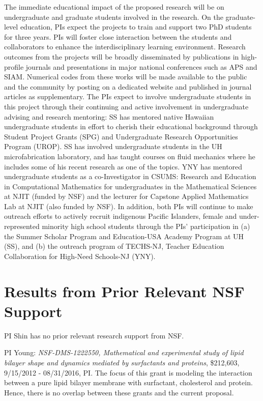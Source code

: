 \documentclass[11pt]{article}
\begin{document}
The immediate educational impact of the proposed research will be on undergraduate and graduate students involved in the research. On the graduate-level education, PIs expect the projects to train and support two PhD students for three years. PIs will foster close interaction between the students and collaborators to enhance the interdisciplinary learning environment. Research outcomes from the projects will be broadly disseminated by publications in high-profile journals and presentations in major national conferences such as APS and SIAM. Numerical codes from these works will be made available to the public and the community by posting on a dedicated website and published in journal articles as supplementary.
The PIs expect to involve undergraduate students in this project through their continuing and active involvement in undergraduate advising and research mentoring: SS has mentored native Hawaiian undergraduate students in effort to cherish their educational background through Student Project Grants (SPG) and Undergraduate Research Opportunities Program (UROP). SS has involved undergraduate students in the UH microfabrication laboratory, and has taught courses on fluid mechanics where he includes some of his recent research as one of the topics. YNY has mentored undergraduate students as a co-Investigator in CSUMS: Research and Education in Computational Mathematics for undergraduates in the Mathematical Sciences at NJIT (funded by NSF) and the lecturer for Capstone Applied Mathematics Lab at NJIT (also funded by NSF). 
In addition, both PIs will continue to make outreach efforts to actively recruit indigenous Pacific Islanders, female and under-represented minority high school students through the PIs' participation in (a) the Summer Scholar Program and Education-USA Academy Program at UH (SS), and (b) the outreach program of TECHS-NJ, Teacher Education Collaboration for High-Need Schools-NJ (YNY).

\vspace*{-7pt}
\section{Results from Prior Relevant NSF Support}
\vspace*{-7pt}

\noindent
PI Shin has no prior relevant research support from NSF.

\noindent
PI Young: {\it NSF-DMS-1222550, Mathematical and experimental study of lipid bilayer 
shape and dynamics mediated by surfactants and proteins}, \$212,603, 9/15/2012 - 08/31/2016, PI. 
The focus of this grant is  modeling the interaction between a pure lipid bilayer membrane with surfactant, cholesterol and protein.
Hence, there is no overlap between these grants and the current proposal.
\end{document}
